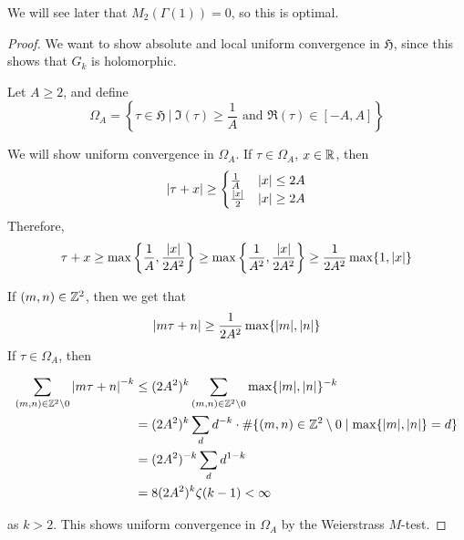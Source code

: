\documentclass{article}
\newcommand{\mfH}{\mathfrak{H}}
\begin{document}
\begin{remark}
    We will see later that \(M_2(\Gamma(1)) = 0\), so this is optimal.
\end{remark}

\begin{proof}
    We want to show absolute and local uniform convergence in \(\mfH\), since this shows that \(G_k\) is holomorphic.

    Let \(A \ge 2\), and define
    \[\Omega_A = \left\{\tau \in \mfH \ \bigg\vert\ \Im(\tau) \ge \frac{1}{A} \text{ and }\Re(\tau) \in [-A, A]\right\}\]

    We will show uniform convergence in \(\Omega_A\). If \(\tau \in \Omega_A\), \(x \in \mathbb{R}\), then
    \[\abs{\tau + x} \ge \begin{cases}
        \frac{1}{A} & \abs{x} \le 2A \\
        \frac{\abs{x}}{2} & \abs{x} \ge 2A
    \end{cases}\]
    Therefore, 
    \[\tau + x \ge \max\left\{\frac{1}{A}, \frac{\abs{x}}{2A^2}\right\} \ge \max\left\{\frac{1}{A^2}, \frac{\abs{x}}{2A^2}\right\} \ge \frac{1}{2A^2}\max\{1, \abs{x}\}\]

    If \((m, n) \in \mathbb{Z}^2\), then we get that
    \[\abs{m \tau + n}\ge \frac{1}{2A^2}\max\{\abs{m}, \abs{n}\}\]
    If \(\tau \in \Omega_A\), then

        
    \begin{align*}
        \sum_{(m, n) \in \mathbb{Z}^2 \setminus 0}\abs{m\tau + n}^{-k} &\le (2A^2)^k \sum_{(m, n)\in \mathbb{Z}^2 \setminus 0} \max\{\abs{m}, \abs{n}\}^{-k} \\
        &= (2A^2)^k\sum_d d^{-k} \cdot \#\{(m, n) \in \mathbb{Z}^2 \setminus 0 \mid \max\{\abs{m}, \abs{n}\} = d\} \\
        &= (2A^2)^{-k} \sum_d d^{1-k} \\
        &= 8(2A^2)^k\zeta(k-1) < \infty
    \end{align*}

    as \(k > 2\). This shows uniform convergence in \(\Omega_A\) by the Weierstrass \(M\)-test.


\end{proof}
\end{document}
